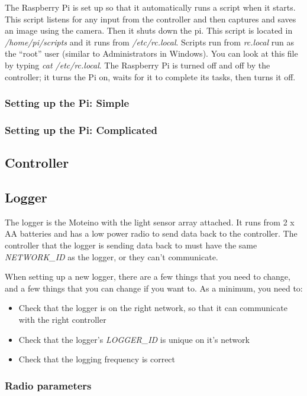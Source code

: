 \documentclass[10pt]{article}
\begin{document}
The Raspberry Pi is set up so that it automatically runs a script when it starts. This script listens for any input from the controller and then captures and saves an image
using the camera. Then it shuts down the pi. This script is located in \textit{/home/pi/scripts} and it runs from \textit{/etc/rc.local}. Scripts run from \textit{rc.local}
run as the ``root'' user (similar to Administrators in Windows). You can look at this file by typing \textit{cat /etc/rc.local}. The Raspberry Pi is turned off and off
by the controller; it turns the Pi on, waits for it to complete its tasks, then turns it off.

\subsubsection{Setting up the Pi: Simple}

\subsubsection{Setting up the Pi: Complicated}

\subsection{Controller}

\subsection{Logger}
The logger is the Moteino with the light sensor array attached. It runs from 2 x AA batteries and has a low power radio to send data back to the controller. The controller
that the logger is sending data back to must have the same \textit{NETWORK\_ID} as the logger, or they can't communicate. \break

When setting up a new logger, there are a few things that you need to change, and a few things that you can change if you want to. As a minimum, you need to:

\begin{itemize}
 \item Check that the logger is on the right network, so that it can communicate with the right controller
 \item Check that the logger's \textit{LOGGER\_ID} is unique on it's network
 \item Check that the logging frequency is correct
\end{itemize}


\subsubsection{Radio parameters}
\end{document}
